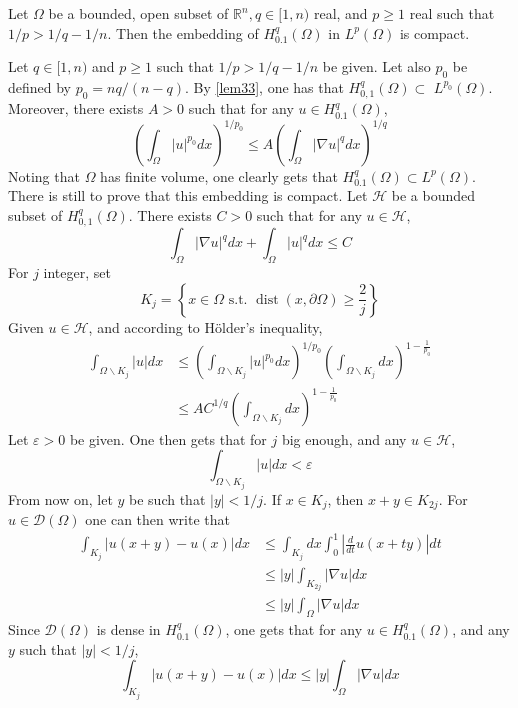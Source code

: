 \documentclass[12pt,hyperref,a4paper,UTF8]{ctexart}
\begin{document}
\begin{Lemma}
    Let $\Omega$ be a bounded, open subset of $\mathbb{R}^n, q \in[1, n)$ real, and $p \geq 1$ real such that $1 / p>1 / q-1 / n$. Then the embedding of $H_{0.1}^q(\Omega)$ in $L^p(\Omega)$ is compact.
\label{lem35}
\end{Lemma}

\begin{Proof}
    Let $q \in[1, n)$ and $p \geq 1$ such that $1 / p>1 / q-1 / n$ be given. Let also $p_0$ be defined by $p_0=n q /(n-q)$. By \autoref{lem33}, one has that $H_{0,1}^q(\Omega) \subset$
    $L^{p_0}(\Omega)$. Moreover, there exists $A>0$ such that for any $u \in H_{0.1}^q(\Omega)$,
$$
\left(\int_{\Omega}|u|^{p_0} d x\right)^{1 / p_0} \leq A\left(\int_{\Omega}|\nabla u|^q d x\right)^{1 / q}
$$
Noting that $\Omega$ has finite volume, one clearly gets that $H_{0.1}^q(\Omega) \subset L^p(\Omega)$. There is still to prove that this embedding is compact. Let $\mathcal{H}$ be a bounded subset of $H_{0,1}^q(\Omega)$. There exists $C>0$ such that for any $u \in \mathcal{H}$,
$$
\int_{\Omega}|\nabla u|^q d x+\int_{\Omega}|u|^q d x \leq C
$$
For $j$ integer, set
$$
K_j=\left\{x \in \Omega \text { s.t. } \operatorname{dist}(x, \partial \Omega) \geq \frac{2}{j}\right\}
$$
Given $u \in \mathcal{H}$, and according to Hölder's inequality,
$$
\begin{aligned}
\int_{\Omega \backslash K_j}|u| d x & \leq\left(\int_{\Omega \backslash K_j}|u|^{p_0} d x\right)^{1 / p_0}\left(\int_{\Omega \backslash K_j} d x\right)^{1-\frac{1}{p_0}} \\
& \leq A C^{1 / q}\left(\int_{\Omega \backslash K_j} d x\right)^{1-\frac{1}{p_0}}
\end{aligned}
$$
Let $\varepsilon>0$ be given. One then gets that for $j$ big enough, and any $u \in \mathcal{H}$,
$$
\int_{\Omega \backslash K_j}|u| d x<\varepsilon
$$
From now on, let $y$ be such that $|y|<1 / j$. If $x \in K_j$, then $x+y \in K_{2 j}$. For $u \in \mathcal{D}(\Omega)$ one can then write that
$$
\begin{aligned}
\int_{K_j}|u(x+y)-u(x)| d x & \leq \int_{K_j} d x \int_0^1\left|\frac{d}{d t} u(x+t y)\right| d t \\
& \leq|y| \int_{K_{2 j}}|\nabla u| d x \\
& \leq|y| \int_{\Omega}|\nabla u| d x
\end{aligned}
$$
Since $\mathcal{D}(\Omega)$ is dense in $H_{0.1}^q(\Omega)$, one gets that for any $u \in H_{0.1}^q(\Omega)$, and any $y$ such that $|y|<1 / j$,
$$
\int_{K_j}|u(x+y)-u(x)| d x \leq|y| \int_{\Omega}|\nabla u| d x
$$
\end{Proof}
\end{document}
